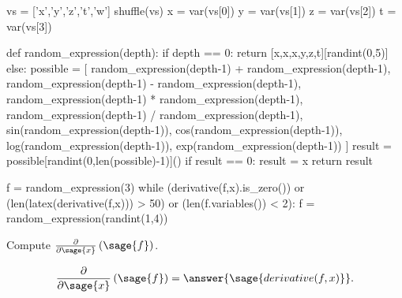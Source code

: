 \documentclass{ximera}
\author{Jim Fowler}
\begin{document}
\makerandom

\begin{sagesilent}
  vs = ['x','y','z','t','w']
  shuffle(vs)
  x = var(vs[0])
  y = var(vs[1])
  z = var(vs[2])
  t = var(vs[3])  

  def random_expression(depth):
    if depth == 0:
      return [x,x,x,y,z,t][randint(0,5)]
    else:
      possible = [
        random_expression(depth-1) + random_expression(depth-1),
        random_expression(depth-1) - random_expression(depth-1),
        random_expression(depth-1) * random_expression(depth-1),
        random_expression(depth-1) / random_expression(depth-1),
        sin(random_expression(depth-1)),
        cos(random_expression(depth-1)),
        log(random_expression(depth-1)),
        exp(random_expression(depth-1))
      ]
      result = possible[randint(0,len(possible)-1)]()
      if result == 0:
        result = x
      return result

  f = random_expression(3)
  while (derivative(f,x).is_zero()) or (len(latex(derivative(f,x))) > 50) or (len(f.variables()) < 2):
    f = random_expression(randint(1,4))
  
\end{sagesilent}

\begin{exercise}

  Compute $\frac{\partial}{\partial\sage{x}} \left( \sage{f} \right)$.

  \begin{prompt}
    \[
      \frac{\partial}{\partial\sage{x}} \left( \sage{f} \right) = \answer{\sage{derivative(f,x)}}.
    \]
  \end{prompt}
  
\end{exercise}
\end{document}
